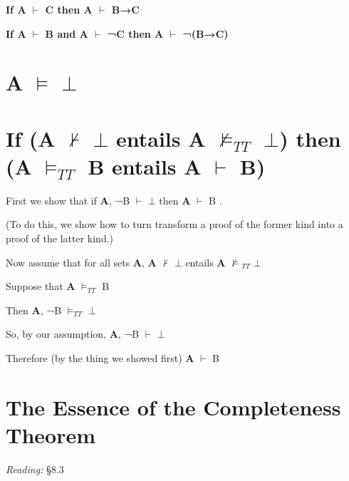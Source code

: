 \documentclass[12pt]{extarticle}
\begin{document}
\begin{multicols*}{3}
\textbf{If A $\vdash$ C then A $\vdash$ B→C}
 
\textbf{If A $\vdash$ B and A $\vdash$ ¬C then A $\vdash$ ¬(B→C)}
 
 
 
\section{A $\vDash$ $\bot$}
 
 
 
\section{If (A $\nvdash$ $\bot$ entails A $\nvDash _{TT}$ $\bot$) then (A $\vDash_{TT}$ B entails A $\vdash$ B) }
 
First we show that if \textbf{A}, ¬B $\vdash$ $\bot$ then \textbf{A} $\vdash$ B .
 
(To do this, we show how to turn transform a proof of the former kind into a proof of the latter kind.)
 
Now assume that for all sets \textbf{A}, \textbf{A} $\nvdash$ $\bot$ entails \textbf{A} $\nvDash$$_{TT}$ $\bot$
 
Suppose that \textbf{A} $\vDash_{TT}$ B
 
Then \textbf{A}, ¬B $\vDash_{TT}$ $\bot$
 
So, by our assumption, \textbf{A}, ¬B $\vdash$ $\bot$
 
Therefore (by the thing we showed first) \textbf{A} $\vdash$ B
 
 
 
\section{The Essence of the Completeness Theorem}
 
\emph{Reading:} §8.3
 

\end{multicols*}
\end{document}
